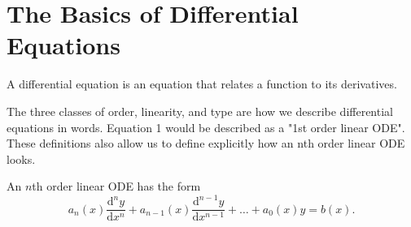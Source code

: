 \chapter{The Basics of Differential Equations}
\noindent
A differential equation is an equation that relates a function to its derivatives.



\noindent
The three classes of order, linearity, and type are how we describe differential equations in words. Equation 1 would be described as a "1st order linear ODE". These definitions also allow us to define explicitly how an nth order linear ODE looks.


\begin{definition}
	An $n$th order linear ODE has the form
	\begin{equation*}
	a_n(x)\frac{\mathrm{d}^n y}{\mathrm{d} x^n} + a_{n-1}(x)\frac{\mathrm{d}^{n-1} y}{\mathrm{d} x^{n-1}} + \ldots + a_0(x)y = b(x).
	\end{equation*}
\end{definition}



